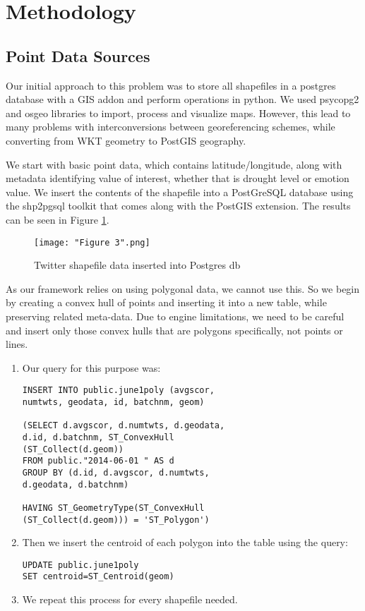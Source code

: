 \documentclass[conference]{IEEEtran}
\begin{document}
\section{Methodology}



\subsection{Point Data Sources}

Our initial approach to this problem was to store all shapefiles in a postgres database with a GIS addon and perform operations in python. We used psycopg2 and osgeo libraries to import, process and visualize maps. However, this lead to many problems with interconversions between georeferencing schemes, while converting from WKT geometry to PostGIS geography.

We start with basic point data, which contains latitude/longitude, along with metadata identifying value of interest, whether that is drought level or emotion value. We insert the contents of the shapefile into a PostGreSQL database using the shp2pgsql toolkit that comes along with the PostGIS extension. The results can be seen in Figure \ref{Figure 3}.

\begin{figure}[ht]
\centerline{\texttt{[image: "Figure 3".png]}}
\caption{Twitter shapefile data inserted into Postgres db}
\label{Figure 3}
\end{figure}

As our framework relies on using polygonal data, we cannot use this. So we begin by creating a convex hull of points and inserting it into a new table, while preserving related meta-data. Due to engine limitations, we need to be careful and insert only those convex hulls that are polygons specifically, not points or lines.

\begin{enumerate}
	\item Our query for this purpose was:
\begin{lstlisting}
INSERT INTO public.june1poly (avgscor, 
numtwts, geodata, id, batchnm, geom)

(SELECT d.avgscor, d.numtwts, d.geodata, 
d.id, d.batchnm, ST_ConvexHull
(ST_Collect(d.geom))
FROM public."2014-06-01 " AS d
GROUP BY (d.id, d.avgscor, d.numtwts,
d.geodata, d.batchnm)

HAVING ST_GeometryType(ST_ConvexHull
(ST_Collect(d.geom))) = 'ST_Polygon')
\end{lstlisting}
	\item Then we insert the centroid of each polygon into the table using the query:

\begin{lstlisting}
UPDATE public.june1poly 
SET centroid=ST_Centroid(geom)
\end{lstlisting}

	\item We repeat this process for every shapefile needed.
\end{enumerate}
\end{document}
